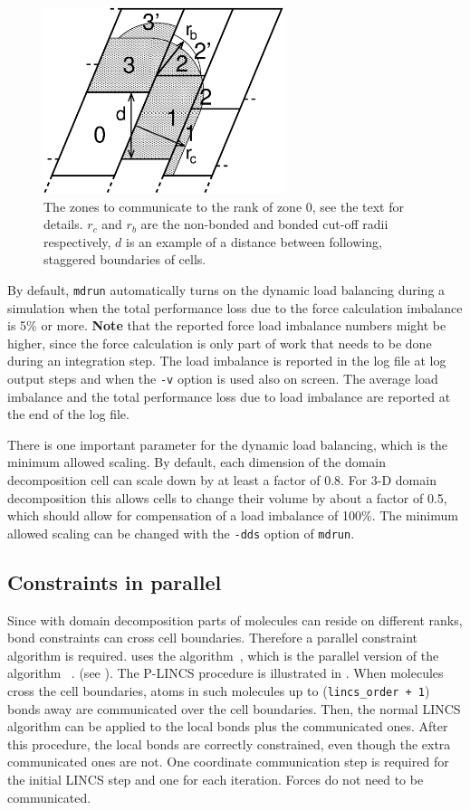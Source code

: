 \begin{figure}
\centerline{\includegraphics[width=7cm]{plots/dd-tric}}
\caption{
The zones to communicate to the rank of zone 0,
see the text for details. $r_c$ and $r_b$ are the non-bonded
and bonded cut-off radii respectively, $d$ is an example
of a distance between following, staggered boundaries of cells.
\label{fig:ddtric}
}
\end{figure}

By default, {\tt mdrun} automatically turns on the dynamic load
balancing during a simulation when the total performance loss
due to the force calculation imbalance is 5\% or more.
{\bf Note} that the reported force load imbalance numbers might be higher,
since the force calculation is only part of work that needs to be done
during an integration step.
The load imbalance is reported in the log file at log output steps
and when the {\tt -v} option is used also on screen.
The average load imbalance and the total performance loss
due to load imbalance are reported at the end of the log file.

There is one important parameter for the dynamic load balancing,
which is the minimum allowed scaling. By default, each dimension
of the domain decomposition cell can scale down by at least
a factor of 0.8. For 3-D domain decomposition this allows cells
to change their volume by about a factor of 0.5, which should allow
for compensation of a load imbalance of 100\%.
The minimum allowed scaling can be changed with the {\tt -dds}
option of {\tt mdrun}.

\subsection{Constraints in parallel}
\label{subsec:plincs}
Since with domain decomposition parts of molecules can reside
on different ranks, bond constraints can cross cell boundaries.
Therefore a parallel constraint algorithm is required.
{\gromacs} uses the  algorithm~\cite{Hess2008a},
which is the parallel version of the  algorithm~\cite{Hess97}
{.}
{(see ).}
The P-LINCS procedure is illustrated in .
When molecules cross the cell boundaries, atoms in such molecules
up to ({\tt lincs_order + 1}) bonds away are communicated over the cell boundaries.
Then, the normal LINCS algorithm can be applied to the local bonds
plus the communicated ones. After this procedure, the local bonds
are correctly constrained, even though the extra communicated ones are not.
One coordinate communication step is required for the initial LINCS step
and one for each iteration. Forces do not need to be communicated.

